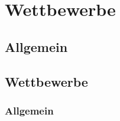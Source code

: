 \chapter{Wettbewerbe}
\renewcommand{\kapitelautor}{Autor: Andreas Novak}

\section{Allgemein}

\section{Wettbewerbe}
\subsection{Allgemein}
